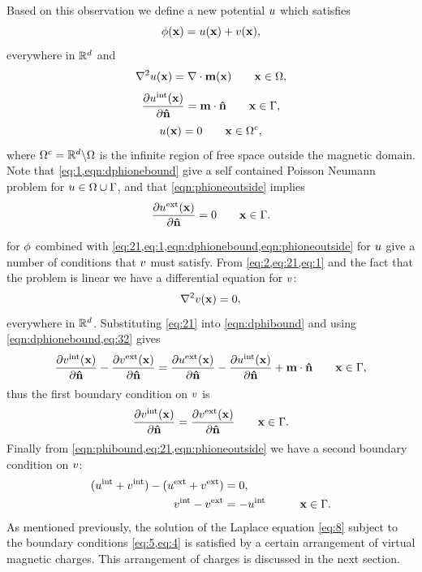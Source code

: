 Based on this observation we define a new potential $u$ which satisfies
\begin{equation}
  \phi(\boldsymbol{\mathrm{x}}) = u(\boldsymbol{\mathrm{x}}) + v(\boldsymbol{\mathrm{x}}),
  \label{eq:21}
\end{equation}
everywhere in $\mathbb{R}^d$ and
\begin{equation}
  \nabla^2 u(\boldsymbol{\mathrm{x}}) = \nabla \cdot \boldsymbol{\mathrm{m}}(\boldsymbol{\mathrm{x}}) \qquad \boldsymbol{\mathrm{x}} \in \Omega,
  \label{eq:1}
\end{equation}
\begin{equation}
  \frac{\partial u^{\mathrm{int}}(\boldsymbol{\mathrm{x}})}{\partial \boldsymbol{\mathrm{\hat{n}}}} = \boldsymbol{\mathrm{m}} \cdot \boldsymbol{\mathrm{\hat{n}}} \qquad \boldsymbol{\mathrm{x}} \in {\Gamma},
  \label{eqn:dphionebound}
\end{equation}
\begin{equation}
  u(\boldsymbol{\mathrm{x}}) = 0 \qquad \boldsymbol{\mathrm{x}} \in {\Omega^c},
  \label{eqn:phioneoutside}
\end{equation}
where ${\Omega^c} = \mathbb{R}^d \backslash \Omega$ is the infinite region of free space outside the magnetic domain.
Note that \cref{eq:1,eqn:dphionebound} give a self contained Poisson Neumann problem for $u \in \Omega \cup {\Gamma}$, and that \cref {eqn:phioneoutside} implies
\begin{equation}
  \frac{\partial u^{\mathrm{ext}}(\boldsymbol{\mathrm{x}})}{\partial \boldsymbol{\mathrm{\hat{n}}}} = 0 \qquad \boldsymbol{\mathrm{x}} \in {\Gamma}.
  \label{eq:32}
\end{equation}


 for $\phi$ combined with \cref{eq:21,eq:1,eqn:dphionebound,eqn:phioneoutside} for $u$ give a number of conditions that $v$ must satisfy.
From \cref{eq:2,eq:21,eq:1} and the fact that the problem is linear we have a differential equation for $v$:
\begin{equation}
  \label{eq:8}
  \nabla^2 v(\boldsymbol{\mathrm{x}}) = 0,
\end{equation}
everywhere in $\mathbb{R}^d$.
Substituting \cref{eq:21} into \cref{eqn:dphibound} and using \cref{eqn:dphionebound,eq:32} gives
\begin{equation}
    \frac{\partial v^{\mathrm{int}}(\boldsymbol{\mathrm{x}})}{\partial \boldsymbol{\mathrm{\hat{n}}}} - \frac{\partial v^{\mathrm{ext}}(\boldsymbol{\mathrm{x}})}{\partial \boldsymbol{\mathrm{\hat{n}}}} =
    \frac{\partial u^{\mathrm{ext}}(\boldsymbol{\mathrm{x}})}{\partial \boldsymbol{\mathrm{\hat{n}}}} - \frac{\partial u^{\mathrm{int}}(\boldsymbol{\mathrm{x}})}{\partial \boldsymbol{\mathrm{\hat{n}}}}
    + \boldsymbol{\mathrm{m}} \cdot \boldsymbol{\mathrm{\hat{n}}} \qquad \boldsymbol{\mathrm{x}} \in {\Gamma},
\end{equation}
thus the first boundary condition on $v$ is
\begin{equation}
  \frac{\partial v^{\mathrm{int}}(\boldsymbol{\mathrm{x}})}{\partial \boldsymbol{\mathrm{\hat{n}}}} = \frac{\partial v^{\mathrm{ext}}(\boldsymbol{\mathrm{x}})}{\partial \boldsymbol{\mathrm{\hat{n}}}}  \qquad \boldsymbol{\mathrm{x}} \in {\Gamma}.
  \label{eq:5}
\end{equation}
Finally from \cref{eqn:phibound,eq:21,eqn:phioneoutside} we have a second boundary condition on $v$:
\begin{equation}
  \begin{aligned}
    (u^{\mathrm{int}} + v^{\mathrm{int}}) - (u^{\mathrm{ext}} + v^{\mathrm{ext}}) &= 0, \\
    v^{\mathrm{int}} - v^{\mathrm{ext}} &= - u^{\mathrm{int}} &\qquad \boldsymbol{\mathrm{x}} \in {\Gamma}.
    \label{eq:4}
  \end{aligned}
\end{equation}
As mentioned previously, the solution of the Laplace equation \cref{eq:8} subject to the boundary conditions \cref{eq:5,eq:4} is satisfied by a certain arrangement of virtual magnetic charges.
This arrangement of charges is discussed in the next section.

